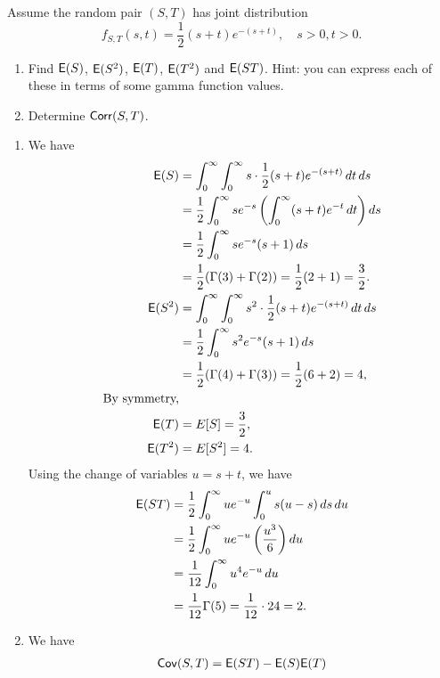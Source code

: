 \documentclass[12pt]{article}
\newcommand{\E}{{\sf E}}
\newcommand{\Cov}{{\sf Cov}}
\newcommand{\Corr}{{\sf Corr}}
\newenvironment{problem}[2][Problem]{\begin{trivlist}
\item[\hskip \labelsep {\bfseries #1}\hskip \labelsep {\bfseries #2.}]}
{\end{trivlist}}
\begin{document}
\begin{problem}{6}
  Assume the random pair $(S, T )$ has joint distribution
  \[
  f_{S,T}(s, t) = \frac{1}{2} (s + t)e^{-(s+t)}, \quad s > 0, t > 0.
  \]
  \begin{enumerate}
    \item Find $\E(S)$, $\E(S^2)$, $\E(T)$, $\E(T^2)$ and $\E(ST)$. 
    Hint: you can express each of these in terms of some gamma function values.
    \item Determine $\Corr(S, T)$.
  \end{enumerate}
  \begin{enumerate}
    \item We have
    \begin{align*}
      \E(S) &= \int_0^\infty \int_0^\infty s \cdot \frac{1}{2} (s + t) 
      e^{-(s+t)} \, dt \, ds \\
      &= \frac{1}{2} \int_0^\infty s e^{-s} \left( \int_0^\infty (s + t) 
      e^{-t} \, dt \right) ds \\
      &= \frac{1}{2} \int_0^\infty s e^{-s} (s + 1) \, ds \\
      &= \frac{1}{2} (\Gamma(3) + \Gamma(2)) = \frac{1}{2} (2 + 1) = 
      \frac{3}{2}.\\
      \E(S^2) &= \int_0^\infty \int_0^\infty s^2 \cdot \frac{1}{2} (s + t) 
      e^{-(s+t)} \, dt \, ds \\
      &= \frac{1}{2} \int_0^\infty s^2 e^{-s} (s + 1) \, ds \\
      &= \frac{1}{2} (\Gamma(4) + \Gamma(3)) = \frac{1}{2} (6 + 2) = 4, \\
      \text{By symmetry,} \\
      \E(T) &= E[S] = \frac{3}{2}, \\
      \E(T^2) &= E[S^2] = 4.
    \end{align*}
    Using the change of variables $u = s + t$, we have
    \begin{align*}
      \E(ST) &= \frac{1}{2}\int_0^\infty u e^{-u} \int_0^u s (u - s) \, ds \, du \\
      &= \frac{1}{2} \int_0^\infty u e^{-u} \left( \frac{u^3}{6} \right) du \\
      &= \frac{1}{12} \int_0^\infty u^4 e^{-u} \, du\\
      &= \frac{1}{12} \Gamma(5) = \frac{1}{12} \cdot 24 = 2.
    \end{align*}
    \item We have
    \begin{align*}
      \Cov(S, T) &= \E(ST) - \E(S) \E(T) \\

\end{align*}
\end{enumerate}
\end{problem}
\end{document}
